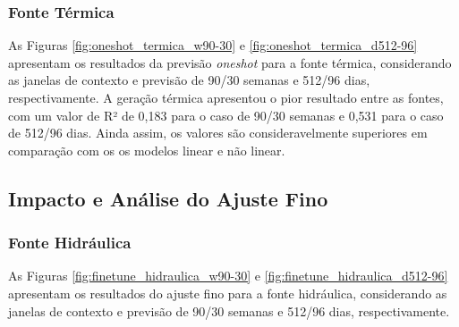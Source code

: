 \subsubsection{Fonte Térmica}
\begin{figure}[!ht]
  {}
  {}
\end{figure}
\begin{figure}[!ht]
  {}
  {}
\end{figure}
As Figuras \ref{fig:oneshot_termica_w90-30} e \ref{fig:oneshot_termica_d512-96} apresentam os resultados da previsão
\textit{oneshot} para a fonte térmica, considerando as janelas de contexto e previsão de 90/30 semanas e 512/96 dias, respectivamente.
A geração térmica apresentou o pior resultado entre as fontes, com um valor de R² de 0,183 para o caso de 90/30 semanas
e 0,531 para o caso de 512/96 dias. Ainda assim, os valores são consideravelmente superiores em comparação com os os
modelos linear e não linear.

\subsection{Impacto e Análise do Ajuste Fino}
\subsubsection{Fonte Hidráulica}
\begin{figure}[!ht]
  {}
  {}
\end{figure}
\begin{figure}[!ht]
  {}
  {}
\end{figure}
As Figuras \ref{fig:finetune_hidraulica_w90-30} e \ref{fig:finetune_hidraulica_d512-96} apresentam os resultados do ajuste fino
para a fonte hidráulica, considerando as janelas de contexto e previsão de 90/30 semanas e 512/96 dias, respectivamente.

